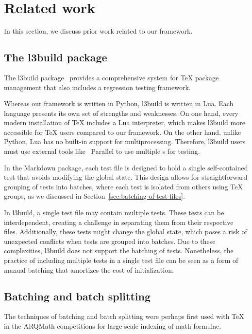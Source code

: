 \documentclass[final]{ltugboat}
\begin{document}
\section{Related work}
\label{sec:related-work}

In this section, we discuss prior work related to our framework.

\subsection{The l3build package}
The l3build package~\cite{mittelbach2014l3build, wright2015automating, wright2022l3build, latex2023l3build} provides a comprehensive system for \TeX{} package management that also includes a regression testing framework.

Whereas our framework is written in Python, l3build is written in Lua. Each language presents its own set of strengths and weaknesses. On one hand, every modern installation of \TeX{} includes a Lua interpreter, which makes l3build more accessible for \TeX{} users compared to our framework. On the other hand, unlike Python, Lua has no built-in support for multiprocessing. Therefore, l3build users must use external tools like ~Parallel to use multiple s for testing.

In the Markdown package, each test file is designed to hold a single self-contained test that avoids modifying the global state. This design allows for straightforward grouping of tests into batches, where each test is isolated from others using \TeX{} groups, as we discussed in Section~\ref{sec:batching-of-test-files}.

In l3build, a single test file may contain multiple tests. These tests can be interdependent, creating a challenge in separating them from their respective files. Additionally, these tests might change the global state, which poses a risk of unexpected conflicts when tests are grouped into batches. Due to these complexities, l3build does not support the batching of tests. Nonetheless, the practice of including multiple tests in a single test file can be seen as a form of manual batching that amortizes the cost of initialization.

\subsection{Batching and batch splitting}
The techniques of batching and batch splitting were perhaps first used with \TeX{} in the ARQMath competitions for large-scale indexing of math formulae.
\end{document}
